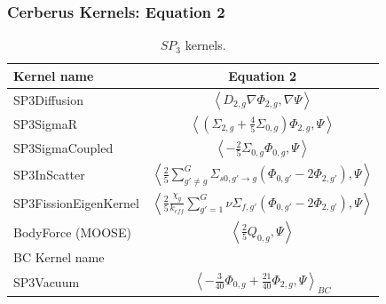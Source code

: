 \begin{frame}
\frametitle{Cerberus Kernels: Equation 2}

\begin{table}[htbp!]
  \centering
  \caption{$SP_3$ kernels.}
  \begin{tabular}{lc}
  \toprule
  Kernel name           & Equation 2 \\
  \midrule
  SP3Diffusion           & $\left< D_{2,g} \nabla \Phi_{2,g}, \nabla \Psi \right>$ \\
  SP3SigmaR              & $\left< \left( \Sigma_{2,g} + \frac{4}{5} \Sigma_{0,g} \right) \Phi_{2,g}, \Psi \right>$ \\
  SP3SigmaCoupled        & $\left< - \frac{2}{5} \Sigma_{0,g} \Phi_{0,g}, \Psi \right>$ \\
  SP3InScatter           & $\left< \frac{2}{5} \sum_{g'\ne g}^G \Sigma_{s0,g' \rightarrow g} \left( \Phi_{0,g'} - 2 \Phi_{2,g'} \right), \Psi \right>$ \\
  SP3FissionEigenKernel  & $\left< \frac{2}{5} \frac{\chi_g}{k_{eff}} \sum_{g'=1}^G \nu\Sigma_{f,g'} \left( \Phi_{0,g'} - 2 \Phi_{2,g'} \right), \Psi \right>$ \\
  BodyForce (MOOSE)      & $\left< \frac{2}{5} Q_{0,g}, \Psi \right>$ \\
  \midrule
  BC Kernel name & \\
  \midrule
  SP3Vacuum                & $\left< - \frac{3}{40} \Phi_{0,g} + \frac{21}{40} \Phi_{2,g}, \Psi \right>_{BC}$ \\
  \bottomrule
  \end{tabular}
\end{table}
\end{frame}
